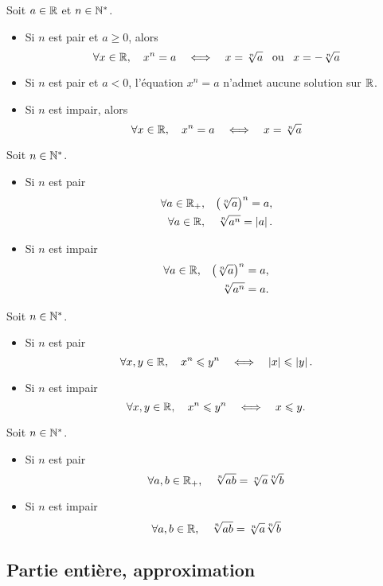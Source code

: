 \documentclass{magnoliaold}
\begin{document}
\begin{remarques}
\remarque Soit $a\in\mathbb{R}$ et $n\in{\mathbb{N}^*}$.
  \begin{itemize}
  \item Si $n$ est pair et $a\geq 0$, alors
    \[\forall x\in\mathbb{R},\quad x^n=a \quad\Longleftrightarrow\quad x=\sqrt[n]{a} \quad\!\text{ou}\quad\! x=-\sqrt[n]{a}\]
  \item Si $n$ est pair et $a< 0$, l'équation $x^n=a$ n'admet aucune solution sur $\mathbb{R}$.
  \item Si $n$ est impair, alors
    \[\forall x\in\mathbb{R},\quad x^n=a \quad\Longleftrightarrow\quad x=\sqrt[n]{a}\]
  \end{itemize}
\remarque Soit $n\in{\mathbb{N}^*}$.
  \begin{itemize}
  \item Si $n$ est pair
  \begin{eqnarray*}
  \forall a\in\mathbb{R}_+, & & \left(\sqrt[n]{a}\right)^n=a,\\
  \forall a\in\mathbb{R}, & & \sqrt[n]{a^n}=\left|a\right|.
  \end{eqnarray*}
  \item Si $n$ est impair
  \begin{eqnarray*}
  \forall a\in\mathbb{R}, & & \left(\sqrt[n]{a}\right)^n=a,\\
                  & & \sqrt[n]{a^n}=a.
  \end{eqnarray*}
  \end{itemize}
\remarque Soit $n\in{\mathbb{N}^*}$.
  \begin{itemize}
  \item Si $n$ est pair
  \[\forall x,y\in\mathbb{R},\quad x^n\leqslant y^n \quad\Longleftrightarrow\quad \left|x\right|\leqslant\left|y\right|.\]
  \item Si $n$ est impair
  \[\forall x,y\in\mathbb{R},\quad x^n\leqslant y^n \quad\Longleftrightarrow\quad x\leqslant y.\]
  \end{itemize}
\end{remarques}

\begin{proposition}
Soit $n\in{\mathbb{N}^*}$.
\begin{itemize}
\item Si $n$ est pair
  \[\forall a,b\in\mathbb{R}_+,\quad \sqrt[n]{ab}=\sqrt[n]{a}\sqrt[n]{b}\]
\item Si $n$ est impair
  \[\forall a,b\in\mathbb{R},\quad \sqrt[n]{ab}=\sqrt[n]{a}\sqrt[n]{b}\]
\end{itemize}
\end{proposition}

\subsection{Partie entière, approximation}
\end{document}

